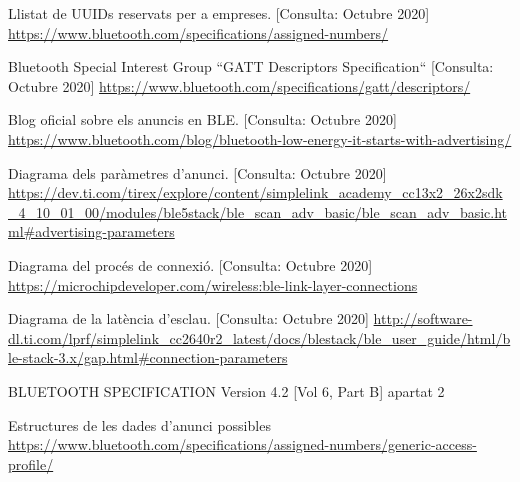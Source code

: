 \begin{thebibliography}{2}
Llistat de UUIDs reservats per a empreses.
[Consulta: Octubre 2020]\newline
\href{https://www.bluetooth.com/specifications/assigned-numbers/}{https://www.bluetooth.com/specifications/assigned-numbers/}

Bluetooth Special Interest Group
``GATT Descriptors Specification``
[Consulta: Octubre 2020]\newline
\href{https://www.bluetooth.com/specifications/gatt/descriptors/}{https://www.bluetooth.com/specifications/gatt/descriptors/}

Blog oficial sobre els anuncis en BLE. [Consulta: Octubre 2020]\newline
\href{https://www.bluetooth.com/blog/bluetooth-low-energy-it-starts-with-advertising/}{ https://www.bluetooth.com/blog/bluetooth-low-energy-it-starts-with-advertising/}

Diagrama dels paràmetres d'anunci.
[Consulta: Octubre 2020] \newline
\href{https://dev.ti.com/tirex/explore/content/simplelink\_academy\_cc13x2\_26x2sdk\_4\_10\_01\_00/modules/ble5stack/ble\_scan\_adv\_basic/ble\_scan\_adv\_basic.html\#advertising-parameter}{https://dev.ti.com/tirex/explore/content/simplelink\_academy\_cc13x2\_26x2sdk\_4\_10\_01\_00/modules/ble5stack/ble\_scan\_adv\_basic/ble\_scan\_adv\_basic.html\#advertising-parameters}

Diagrama del procés de connexió.
[Consulta: Octubre 2020] \newline
\href{https://microchipdeveloper.com/wireless:ble-link-layer-connections}{https://microchipdeveloper.com/wireless:ble-link-layer-connections}

Diagrama de la latència d'esclau.
[Consulta: Octubre 2020] \newline
\href{http://software-dl.ti.com/lprf/simplelink\_cc2640r2\_latest/docs/blestack/ble\_user\_guide/html/ble-stack-3.x/gap.html\#connection-parameters}{http://software-dl.ti.com/lprf/simplelink\_cc2640r2\_latest/docs/blestack/ble\_user\_guide/html/ble-stack-3.x/gap.html\#connection-parameters}

BLUETOOTH SPECIFICATION Version 4.2 [Vol 6, Part B] apartat 2 

Estructures de les dades d'anunci possibles \newline
\href{https://www.bluetooth.com/specifications/assigned-numbers/generic-access-profile/}{https://www.bluetooth.com/specifications/assigned-numbers/generic-access-profile/}


\end{thebibliography}
